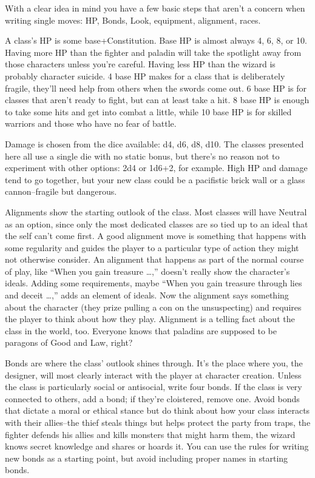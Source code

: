 With a clear idea in mind you have a few basic steps that aren't a concern when writing single moves: HP, Bonds, Look, equipment, alignment, races.


A class's HP is some base+Constitution. Base HP is almost always 4, 6, 8, or 10. Having more HP than the fighter and paladin will take the spotlight away from those characters unless you're careful. Having less HP than the wizard is probably character suicide. 4 base HP makes for a class that is deliberately fragile, they'll need help from others when the swords come out. 6 base HP is for classes that aren't ready to fight, but can at least take a hit. 8 base HP is enough to take some hits and get into combat a little, while 10 base HP is for skilled warriors and those who have no fear of battle.


Damage is chosen from the dice available: d4, d6, d8, d10. The classes presented here all use a single die with no static bonus, but there's no reason not to experiment with other options: 2d4 or 1d6+2, for example. High HP and damage tend to go together, but your new class could be a pacifistic brick wall or a glass cannon--fragile but dangerous.


Alignments show the starting outlook of the class. Most classes will have Neutral as an option, since only the most dedicated classes are so tied up to an ideal that the self can't come first. A good alignment move is something that happens with some regularity and guides the player to a particular type of action they might not otherwise consider. An alignment that happens as part of the normal course of play, like ``When you gain treasure \ldots ,'' doesn't really show the character's ideals. Adding some requirements, maybe ``When you gain treasure through lies and deceit \ldots ,'' adds an element of ideals. Now the alignment says something about the character (they prize pulling a con on the unsuspecting) and requires the player to think about how they play. Alignment is a telling fact about the class in the world, too. Everyone knows that paladins are supposed to be paragons of Good and Law, right?


Bonds are where the class' outlook shines through. It's the place where you, the designer, will most clearly interact with the player at character creation. Unless the class is particularly social or antisocial, write four bonds. If the class is very connected to others, add a bond; if they're cloistered, remove one. Avoid bonds that dictate a moral or ethical stance but do think about how your class interacts with their allies--the thief steals things but helps protect the party from traps, the fighter defends his allies and kills monsters that might harm them, the wizard knows secret knowledge and shares or hoards it. You can use the rules for writing new bonds as a starting point, but avoid including proper names in starting bonds.


